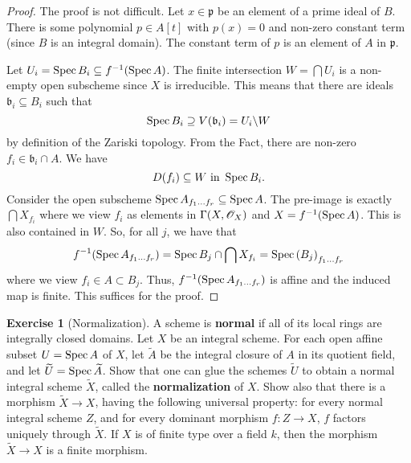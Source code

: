 \documentclass[]{pcmi}
\theoremstyle{plain}
\theoremstyle{definition}
\newtheorem{Exercise}[subsubsection]{Exercise}
\theoremstyle{remark}
\begin{document}
\begin{proof}
    The proof is not difficult. Let $x \in \mathfrak{p}$ be an element of a prime ideal of $B$. There is some polynomial $p \in A[t]$ with $p(x) =0$ and non-zero constant term (since $B$ is an integral domain). The constant term of $p$ is an element of $A$ in $\mathfrak{p}$. 

    Let $U_i = \operatorname{Spec} B_i \subseteq f^{-1}(\operatorname{Spec} A)$. The finite intersection $W = \bigcap U_i$ is a non-empty open subscheme since $X$ is irreducible. This means that there are ideals $\mathfrak{b}_i \subseteq B_i$ such that 
    \[
        \operatorname{Spec} B_i \supseteq V(\mathfrak{b}_i) = U_i \backslash W
    \]
    by definition of the Zariski topology. From the Fact, there are non-zero $f_i \in \mathfrak{b}_i \cap A$. We have 
    \[
        D(f_i) \subseteq W \text{ in } \operatorname{Spec} B_i.
    \]
    Consider the open subscheme $\operatorname{Spec} A_{f_1 \ldots f_r} \subseteq \operatorname{Spec} A$. The pre-image is exactly $\bigcap X_{f_i}$ where we view $f_i$ as elements in $\Gamma(X, \mathscr{O}_X)$ and $X = f^{-1}(\operatorname{Spec} A)$. This is also contained in $W$. So, for all $j$, we have that 
    \[
        f^{-1}(\operatorname{Spec} A_{f_1 \ldots f_r}) = \operatorname{Spec} B_j \cap \bigcap X_{f_i} = \operatorname{Spec} \left( B_j \right)_{f_1 \ldots f_r}
    \]
    where we view $f_i \in A \subset B_j$. Thus, $f^{-1}(\operatorname{Spec} A_{f_1 \ldots f_r})$ is affine and the induced map is finite. This suffices for the proof. 
\end{proof}

\begin{Exercise}[Normalization]
    A scheme is \textbf{normal} if all of its local rings are integrally closed domains. Let $X$ be an integral scheme. For each open affine subset $U = \operatorname{Spec} A$ of $X$, let $\widetilde{A}$ be the integral closure of $A$ in its quotient field, and let $\widetilde{U} = \operatorname{Spec} \widetilde{A}$. Show that one can glue the schemes $\widetilde{U}$ to obtain a normal integral scheme $\widetilde{X}$, called the \textbf{normalization} of $X$. Show also that there is a morphism $\widetilde{X} \to X$, having the following universal property: for every normal integral scheme $Z$, and for every dominant morphism $f : Z \to X$, $f$ factors uniquely through $\widetilde{X}$. If $X$ is of finite type over a field $k$, then the morphism $\widetilde{X} \to X$ is a finite morphism. 
\end{Exercise}
\end{document}
